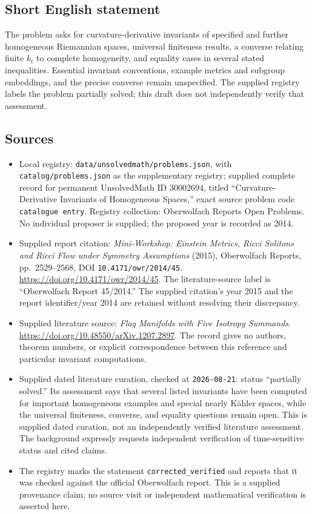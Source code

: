 \documentclass[11pt]{article}
\begin{document}
\subsection{Short English statement}
The problem asks for curvature-derivative invariants of specified and further homogeneous Riemannian spaces, universal finiteness results, a converse relating finite \(k_t\) to complete homogeneity, and equality cases in several stated inequalities. Essential invariant conventions, example metrics and subgroup embeddings, and the precise converse remain unspecified. The supplied registry labels the problem partially solved; this draft does not independently verify that assessment.
\subsection{Sources}
\begin{itemize}
\item Local registry: \texttt{data/unsolvedmath/problems.json}, with \texttt{catalog/problems.json} as the supplementary registry; supplied complete record for permanent UnsolvedMath ID \(30002694\), titled ``Curvature-Derivative Invariants of Homogeneous Spaces,'' exact source problem code \texttt{catalogue entry}. Registry collection: Oberwolfach Reports Open Problems. No individual proposer is supplied; the proposed year is recorded as 2014.
\item Supplied report citation: \emph{Mini-Workshop: Einstein Metrics, Ricci Solitons and Ricci Flow under Symmetry Assumptions} (2015), Oberwolfach Reports, pp.\ 2529--2568, DOI \texttt{10.4171/owr/2014/45}. \url{https://doi.org/10.4171/owr/2014/45}. The literature-source label is ``Oberwolfach Report 45/2014.'' The supplied citation's year 2015 and the report identifier/year 2014 are retained without resolving their discrepancy.
\item Supplied literature source: \emph{Flag Manifolds with Five Isotropy Summands}. \url{https://doi.org/10.48550/arXiv.1207.2897}. The record gives no authors, theorem numbers, or explicit correspondence between this reference and particular invariant computations.
\item Supplied dated literature curation, checked at \texttt{2026-08-21}: status ``partially solved.'' Its assessment says that several listed invariants have been computed for important homogeneous examples and special nearly K\"ahler spaces, while the universal finiteness, converse, and equality questions remain open. This is supplied dated curation, not an independently verified literature assessment. The background expressly requests independent verification of time-sensitive status and cited claims.
\item The registry marks the statement \texttt{corrected\_verified} and reports that it was checked against the official Oberwolfach report. This is a supplied provenance claim; no source visit or independent mathematical verification is asserted here.
\end{itemize}
\end{document}
